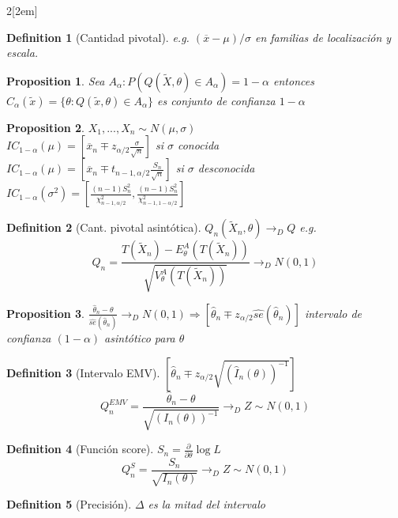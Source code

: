 \documentclass[leqno]{article}
\newtheorem*{proposition}{Proposition}
\newtheorem*{definition}{Definition}
\begin{document}
\begin{multicols}{2}[\columnsep2em]
\begin{definition}[Cantidad pivotal]
e.g. $(\overline x - \mu)/\sigma$ en familias de localización y escala.
\end{definition}

\begin{proposition}
  Sea $A_\alpha : P(Q(\tilde{X}, \theta )\in A_\alpha) = 1-\alpha$ entonces $C_\alpha (\tilde{x}) = \{\theta : Q(\tilde x,\theta)\in A_\alpha \}$ es conjunto de confianza $1-\alpha$
\end{proposition}

\begin{proposition}$X_1, ..., X_n \sim N(\mu, \sigma )$ \\
  $IC_{1-\alpha }(\mu) = [\overline{x}_n \mp z_{\alpha /2} \frac{\sigma }{\sqrt{n} }]$ si $\sigma $ conocida \\
  $IC_{1-\alpha }(\mu) = [\overline{x}_n \mp t_{n-1,\alpha /2} \frac{S_n }{\sqrt{n} }]$ si $\sigma $ desconocida \\
  $IC_{1-\alpha}(\sigma^2) = \left[\frac{(n-1)S^2_n}{\chi^2_{n-1, \alpha/2}}, \frac{(n-1)S^2_n}{\chi^2_{n-1, 1-\alpha/2}} \right]$
\end{proposition}

\begin{definition}[Cant. pivotal asintótica] $Q_n(\tilde{X}_n, \theta ) \to_D Q$ e.g.
  \[
  Q_n = \frac{T(\tilde{X}_n) - E_{\theta }^A (T(\tilde{X}_n))}{\sqrt{V_\theta ^A(T(\tilde{X}_n))} } \to _D N(0,1)
  \] 
\end{definition}

\begin{proposition}$\frac{\hat \theta_n - \theta}{\hat{se}(\hat{\theta }_n)} \to_D N(0, 1) \Rightarrow [\hat{\theta }_n \mp z_{\alpha /2}\hat{se}(\hat{\theta }_n)]$ \quad intervalo de confianza $(1-\alpha )$ asintótico para $\theta$
\end{proposition}

\begin{definition}[Intervalo EMV] $\left[\hat{\theta }_n \mp z_{\alpha /2} \sqrt{(\hat{I}_n(\theta ))^{-1}} \right]$
  \[
	Q_n^{EMV} = \frac{\hat{\theta }_n-\theta }{\sqrt{(I_n(\theta ))^{-1}} } \to _D Z \sim N(0,1)
  \] 
\end{definition}

\begin{definition}[Función score] $S_n = \frac{\partial}{\partial \theta } \log L$
  \[
	Q_n^{S} = \frac{S_n}{\sqrt{I_n(\theta )} } \to _D Z \sim N(0,1)
  \] 
\end{definition}

\begin{definition}[Precisión] $\Delta $ es la mitad del intervalo
\end{definition}



\end{multicols}
\end{document}
